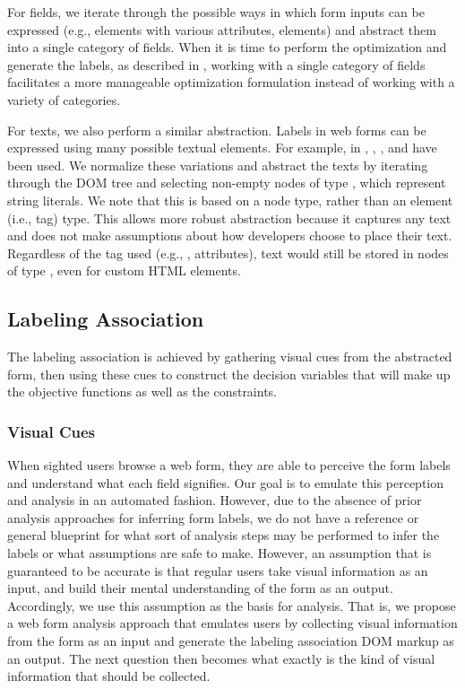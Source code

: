 For fields, we iterate through the possible ways in which form inputs can be 
expressed (e.g.,  elements with various attributes,  
elements) and abstract them into a single category of fields.
When it is time to perform the optimization and generate the labels, 
as described in , 
working with a single category of fields facilitates a more manageable 
optimization formulation instead of working with a variety of categories. 

For texts, we also perform a similar abstraction. 
Labels in web forms can be expressed using many possible textual elements.  
For example, in , , , and  
have been used. We normalize these variations and 
abstract the texts by iterating through the DOM tree and selecting non-empty 
nodes of type , which represent string literals. 
We note that this is based on a node type, rather than
an element (i.e., tag) type.
This allows more robust abstraction because it captures any text and 
does not make assumptions about how developers choose to place their text.
Regardless of the tag used (e.g., , attributes), text would still 
be stored in nodes of type , even for custom HTML elements.
 

\subsection{Labeling Association}  \label{sec:approach-opt}

The labeling association is achieved by gathering visual cues from the abstracted 
form, then using these cues to construct the decision variables that will make 
up the objective functions as well as the constraints. 


\subsubsection{Visual Cues} \label{subsec:cues}
When sighted users browse a web form, they are able to perceive the 
form labels and understand what each field signifies. 
Our goal is to emulate this perception and analysis in 
an automated fashion. 
However, due to the absence of prior analysis approaches for inferring form labels, 
we do not have a reference or general blueprint for what sort of analysis steps may  
be performed to infer the labels or what assumptions are safe to make. 
However, an assumption that is guaranteed to be accurate is that regular users 
take visual information as an input, and build their mental understanding of the 
form as an output. Accordingly, we use this assumption as the basis for analysis. 
That is, we propose a web form analysis approach that emulates users by collecting 
visual information from the form as an input and generate the labeling association 
DOM markup as an output. The next question then becomes what exactly is the kind 
of visual information that should be collected. 

